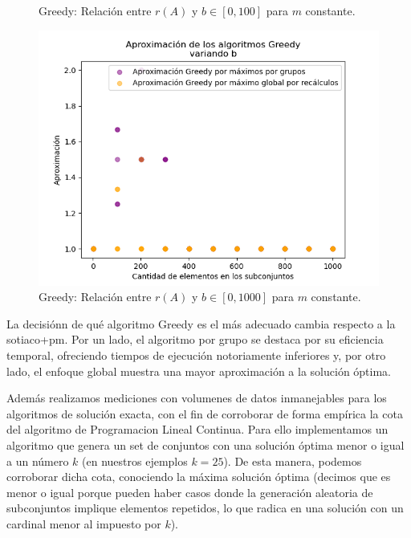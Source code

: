 \begin{figure}[h]
\begin{minipage}{0.45\textwidth}
        \caption{Greedy: Relación entre $r(A)$ y $b \in [0,100]$ para $m$ constante.}
        \label{fig:medicion_r_greedy_var_b_1}
    \end{minipage}\hfill
    \begin{minipage}{0.45\textwidth}
        \centering
        \includegraphics[width=\textwidth]{img/medicion_r_greedy_var_b_2.png}
        \caption{Greedy: Relación entre $r(A)$ y $b \in [0,1000]$ para $m$ constante.}
        \label{fig:medicion_r_greedy_var_b_2}
    \end{minipage}
\end{figure}

La decisiónn de qué algoritmo Greedy es el más adecuado cambia respecto a la sotiaco+pm. Por un lado, el algoritmo por grupo se destaca por su eficiencia temporal, ofreciendo tiempos de ejecución notoriamente inferiores y, por otro lado, el enfoque global muestra una mayor aproximación a la solución óptima.

Además realizamos mediciones con volumenes de datos inmanejables para los algoritmos de solución exacta, con el fin de corroborar de forma empírica la cota del algoritmo de Programacion Lineal Continua. Para ello implementamos un algoritmo que genera un set de conjuntos con una solución óptima menor o igual a un número $k$ (en nuestros ejemplos $k=25$). De esta manera, podemos corroborar dicha cota, conociendo la máxima solución óptima (decimos que es menor o igual porque pueden haber casos donde la generación aleatoria de subconjuntos implique elementos repetidos, lo que radica en una solución con un cardinal menor al impuesto por $k$).


